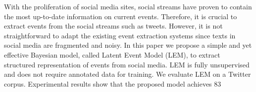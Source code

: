 With the proliferation of social media sites, social streams have proven to contain the most up-to-date information on current events. Therefore, it is crucial to extract events from the social streams such as tweets. However, it is not straightforward to adapt the existing event extraction systems since texts in social media are fragmented and noisy. In this paper we propose a simple and yet effective Bayesian model, called Latent Event Model (LEM), to extract structured representation of events from social media. LEM is fully unsupervised and does not require annotated data for training. We evaluate LEM on a Twitter corpus. Experimental results show that the proposed model achieves 83\\%
